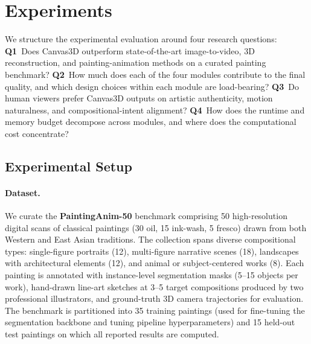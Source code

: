 \section{Experiments}
\label{sec:experiment}

We structure the experimental evaluation around four research
questions:
\textbf{Q1}~Does Canvas3D outperform state-of-the-art image-to-video,
3D reconstruction, and painting-animation methods on a curated
painting benchmark?
\textbf{Q2}~How much does each of the four modules contribute to the
final quality, and which design choices within each module are
load-bearing?
\textbf{Q3}~Do human viewers prefer Canvas3D outputs on artistic
authenticity, motion naturalness, and compositional-intent alignment?
\textbf{Q4}~How does the runtime and memory budget decompose across
modules, and where does the computational cost concentrate?

\subsection{Experimental Setup}

\paragraph{Dataset.}
We curate the \textbf{PaintingAnim-50} benchmark comprising 50
high-resolution digital scans of classical paintings (30 oil, 15
ink-wash, 5 fresco) drawn from both Western and East Asian traditions.
The collection spans diverse compositional types: single-figure
portraits (12), multi-figure narrative scenes (18), landscapes with
architectural elements (12), and animal or subject-centered works (8).
Each painting is annotated with instance-level segmentation masks
(5--15 objects per work), hand-drawn line-art sketches at 3--5 target
compositions produced by two professional illustrators, and
ground-truth 3D camera trajectories for evaluation. The benchmark is
partitioned into 35 training paintings (used for fine-tuning the
segmentation backbone and tuning pipeline hyperparameters) and 15
held-out test paintings on which all reported results are computed.

